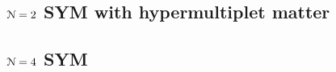 \documentclass[10pt, oneside]{article}
\begin{document}
%
%
%


\subsection{$\mathcal N=2$ SYM with hypermultiplet matter}

\subsection{$\mathcal N=4$ SYM}
\end{document}
